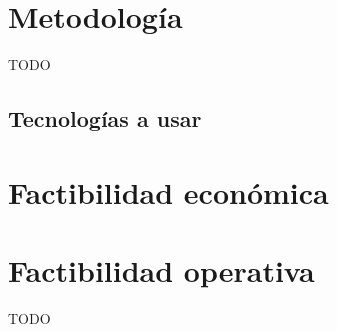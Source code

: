 \section{Metodología}
TODO

\subsection*{Tecnologías a usar}











\section{Factibilidad económica}


\section{Factibilidad operativa}
TODO